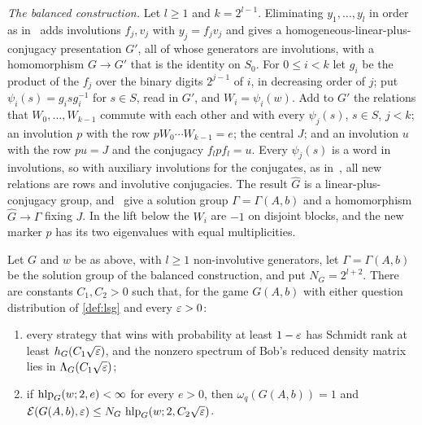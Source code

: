 \emph{The balanced construction.} Let $l\ge1$ and $k=2^{l-1}$. Eliminating $y_1,\dots,y_l$ in order as
in~\cite[Proposition~4.8]{Slo19} adds involutions $f_j,v_j$ with $y_j=f_jv_j$ and gives a homogeneous-linear-plus-conjugacy
presentation $G'$, all of whose generators are involutions, with a homomorphism $G\to G'$ that is the identity on $S_0$. For
$0\le i<k$ let $g_i$ be the product of the $f_j$ over the binary digits $2^{j-1}$ of $i$, in decreasing order of $j$; put
$\psi_i(s)=g_isg_i^{-1}$ for $s\in S$, read in $G'$, and $W_i=\psi_i(w)$. Add to $G'$ the relations that $W_0,\dots,W_{k-1}$
commute with each other and with every $\psi_j(s)$, $s\in S$, $j<k$; an involution $p$ with the row $pW_0\cdots W_{k-1}=e$; the
central $J$; and an involution $u$ with the row $pu=J$ and the conjugacy $f_lpf_l=u$. Every $\psi_j(s)$ is a word in
involutions, so with auxiliary involutions for the conjugates, as in~\cite[Proposition~4.8]{Slo19}, all new relations are rows and
involutive conjugacies. The result $\widehat G$ is a linear-plus-conjugacy group, and~\cite[Lemma~4.4 and Proposition~4.2]{Slo19}
give a solution group $\Gamma=\Gamma(A,b)$ and a homomorphism $\widehat G\to\Gamma$ fixing $J$. In the lift below the $W_i$ are
$-1$ on disjoint blocks, and the new marker $p$ has its two eigenvalues with equal multiplicities.

\begin{proposition}\label{prop:extended}
Let $G$ and $w$ be as above, with $l\ge1$ non-involutive generators, let $\Gamma=\Gamma(A,b)$ be the solution group of the
balanced construction, and put $N_G=2^{l+2}$. There are constants $C_1,C_2>0$ such that, for the game $G(A,b)$ with either
question distribution of \cref{def:lsg} and every $\varepsilon>0$:
\begin{enumerate}[label=(\alph*),itemsep=1pt]
\item every strategy that wins with probability at least $1-\varepsilon$ has Schmidt rank at least $h_G(C_1\sqrt{\varepsilon})$, and the
nonzero spectrum of Bob's reduced density matrix lies in $\Lambda_G(C_1\sqrt{\varepsilon})$;
\item if $\operatorname{hlp}_G(w;2,e)<\infty$ for every $e>0$, then $\omega_q(G(A,b))=1$ and $\mathcal E(G(A,b),\varepsilon)\le N_G\,\operatorname{hlp}_G(w;2,C_2\sqrt{\varepsilon})$.
\end{enumerate}
\end{proposition}

